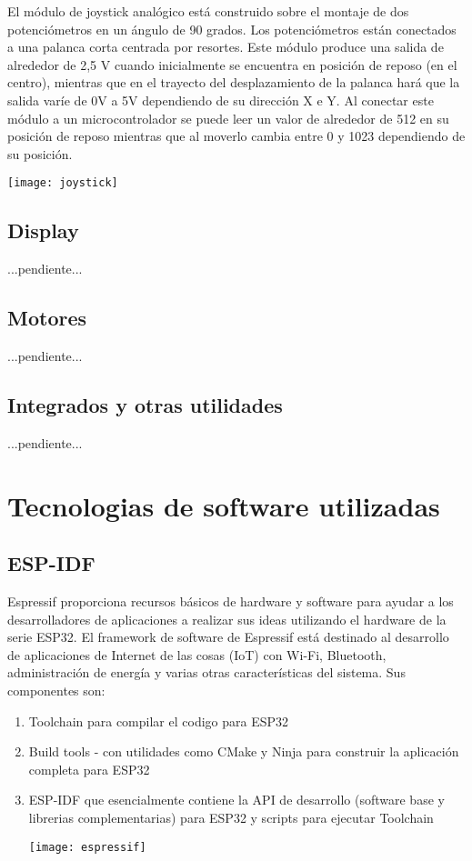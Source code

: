 El módulo de joystick analógico está construido sobre el montaje de dos potenciómetros en un ángulo de 90 grados. Los potenciómetros están conectados a una palanca corta centrada por resortes. Este módulo produce una salida de alrededor de 2,5 V cuando inicialmente se encuentra en posición de reposo (en el centro), mientras que en el trayecto del desplazamiento de la palanca hará que la salida varíe de 0V a 5V
dependiendo de su dirección X e Y. Al conectar este módulo a un microcontrolador se puede leer un valor de alrededor de 512 en su posición de reposo mientras que al moverlo cambia entre 0 y 1023 dependiendo de su posición.


\texttt{[image: joystick]}

\subsection{Display}
...pendiente...

\subsection{Motores}
...pendiente...

\subsection{Integrados y otras utilidades}
...pendiente...


\section{Tecnologias de software utilizadas} 

\subsection{ESP-IDF}

Espressif proporciona recursos básicos de hardware y software para ayudar a los desarrolladores de aplicaciones a realizar sus ideas utilizando el hardware de la serie ESP32. El framework de software de Espressif está destinado al desarrollo de aplicaciones de Internet de las cosas (IoT) con Wi-Fi, Bluetooth, administración de energía y varias otras características del sistema.
Sus componentes son:
\begin{enumerate}
	\item Toolchain para compilar el codigo para ESP32
	\item Build tools - con utilidades como CMake y Ninja para construir la aplicación completa para ESP32
	\item ESP-IDF que esencialmente contiene la API de desarrollo (software base y librerias complementarias) para ESP32 y scripts para ejecutar Toolchain


\texttt{[image: espressif]}

\end{enumerate}

